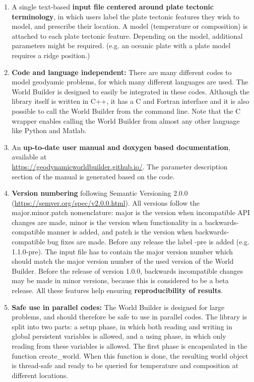 \documentclass{book}
\newcommand{\WB}{{World Builder}}
\begin{document}
\begin{enumerate}
    \item A single text-based {\bf input file centered around plate tectonic terminology}, in which users label the plate tectonic features they wish to model, and prescribe their location. A model (temperature or composition) is attached to each plate tectonic feature. Depending on the model, additional parameters might be required. (e.g. an oceanic plate with a plate model requires a ridge position.) 
    \item {\bf Code and language independent:} There are many different codes to model geodyamic problems, for which many different languages are used. The \WB{} is designed to easily be integrated in these codes. Although the library itself is written in C++, it has a C and Fortran interface and it is also possible to call the \WB{} from the command line. Note that the C wrapper enables calling the \WB{} from almost any other language like Python and Matlab. 
    \item An {\bf up-to-date user manual and doxygen based documentation}, available at \\ \url{https://geodynamicworldbuilder.github.io/}. The parameter description section of the manual is generated based on the code.

    \item {\bf Version numbering } following Semantic Versioning 2.0.0 (\url{https://semver.org/spec/v2.0.0.html}).
    All versions follow the major.minor.patch nomenclature: major is the version when incompatible API changes are made, minor is the version when functionality in a backwards-compatible manner is added, and patch is the version when backwards-compatible bug fixes are made. Before any release the label -pre is added (e.g. 1.1.0-pre). The input file has to contain the major version number which should match the major version number of the used version of the \WB{}. Before the release of version 1.0.0, backwards incompatible changes may be made in minor versions, because this is considered to be a beta release. All these features help ensuring {\bf reproducibility of results}.

    \item {\bf Safe use in parallel codes:} The \WB{} is designed for large problems, and should therefore be safe to use in parallel codes. The library is split into two parts: a setup phase, in which both reading and writing in global persistent variables is allowed, and a using phase, in which only reading from these variables is allowed. The first phase is encapsulated in the function create\_world. When this function is done, the resulting world object is thread-safe and ready to be queried for temperature and composition at different locations.
    

\end{enumerate}
\end{document}
